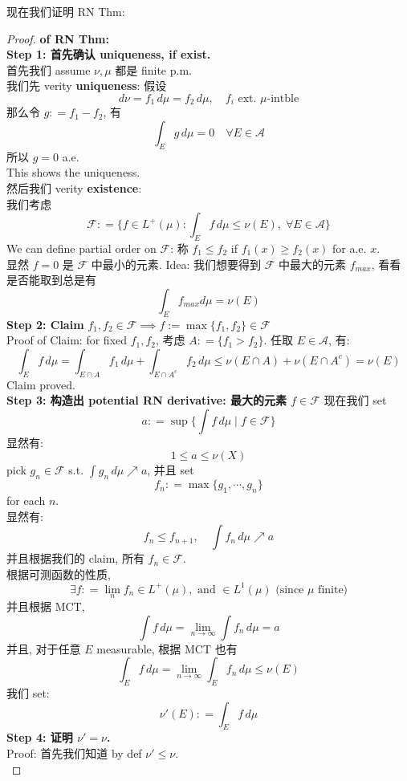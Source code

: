 \documentclass[lang=cn,11pt]{elegantbook}
\begin{document}
现在我们证明 RN Thm:
\begin{proof}
    \textbf{of RN Thm:}\\
    \textbf{Step 1: 首先确认 uniqueness, if exist.}\\
    首先我们 assume $\nu,\mu$ 都是 finite p.m.\\
    我们先 verity \textbf{uniqueness}: 假设 $$d \nu = f_1 \,d \mu = f_2 \, d\mu,\quad f_i \text{ ext. }\mu \text{-intble} $$
    那么令 $g:  = f_1 - f_2$, 有\[
    \int_E g \, d\mu = 0\quad \forall E \in \mathcal{A}
    \]所以 $g = 0 $ a.e.\\
    This shows the uniqueness.\\
   然后我们 verity \textbf{existence}: \\
   我们考虑 \[
   \mathcal{F} : = \bigg\{ f \in L^+(\mu) : \int_E f\, d\mu \leq \nu(E),\;\forall    E \in \mathcal{A} \bigg\}
   \]
  We can define partial order on $\mathcal{F}$: 称 $f_1 \leq f_2$ if $f_1(x) \geq f_2(x)$ for a.e. $x$.\\
  显然 $f = 0$ 是 $\mathcal{F}$ 中最小的元素.
Idea: 我们想要得到 $\mathcal{F}$ 中最大的元素 $f_{max}$, 看看是否能取到总是有 \[
   \int _E f_{max} d\mu = \nu(E)
   \]\textbf{Step 2: Claim} $f_1, f_2 \in \mathcal{F} \implies f:=\max\{f_1, f_2 \} \in \mathcal{F}$\\
Proof of Claim: for fixed $f_1,f_2$, 考虑 $A: = \{ f_1 > f_2 \}$. 任取 $E \in \mathcal{A}$, 有: \[
\int_E f\, d\mu = \int_{E \cap A} f_1\, d \mu  + \int_{E \cap A^c}  f_2 \, d\mu \leq \nu(E\cap A) + \nu(E\cap A^c) = \nu(E)
\]
Claim proved.\\
\textbf{Step 3: 构造出 potential RN derivative: 最大的元素 $f \in \mathcal{F}$ }
现在我们 set \[
a: = \sup \bigg\{ \int f\, d\mu \mid f\in \mathcal{F} \bigg\}
\]
显然有: $$1\leq a \leq \nu(X)$$ pick $g_n \in \mathcal{F}$ s.t. $\int g_n \, d\mu \nearrow a$, 并且 set\[
f_n : = \max \{ g_1,\cdots, g_n\}
\]for each $n$.\\
显然有: \[
f_n \leq f_{n+1},\quad \int f_n \, d\mu \nearrow a
\] 并且根据我们的 claim, 所有 $f_n \in \mathcal{F}$.\\
根据可测函数的性质, \[
\exists f : = \lim_n f_n \in L^+(\mu), \text{ and } \in L^1(\mu) \text{ (since } \mu \text{ finite)}
\]并且根据 MCT, \[
\int f \, d\mu = \lim_{n\to \infty} \int f_n \, d\mu = a
\]
并且, 对于任意 $E$ measurable, 根据 MCT 也有 \[
\int_E f \, d\mu = \lim_{n\to \infty} \int_E f_n \, d\mu \leq \nu(E)
\]我们 set: \[
\nu'(E) : = \int_E f\, d\mu
\]
\textbf{Step 4: 证明 $\nu' = \nu$.}\\
Proof: 首先我们知道 by def $\nu' \leq \nu$. \\

\end{proof}
\end{document}
